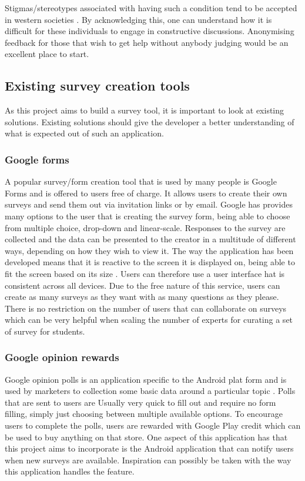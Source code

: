 Stigmas/stereotypes associated with having such a condition tend to be accepted in western societies \cite{corrigan2002paradox}.
By acknowledging this, one can understand how it is difficult for these individuals to engage in constructive discussions.
Anonymising feedback for those that wish to get help without anybody judging would be an excellent place to start. 

\subsection{Existing survey creation tools}
As this project aims to build a survey tool, it is important to look at existing solutions.
Existing solutions should give the developer a better understanding of what is expected out of such an application.

\subsubsection{Google forms}
A popular survey/form creation tool that is used by many people is Google Forms and is offered to users free of charge.
It allows users to create their own surveys and send them out via invitation links or by email.
Google has provides many options to the user that is creating the survey form, being able to choose from multiple choice, drop-down and linear-scale.
Responses to the survey are collected and the data can be presented to the creator in a multitude of different ways, depending on how they wish to
view it. 
The way the application has been developed means that it is reactive to the screen it is displayed on, being able to fit the screen based on its size \cite{google2015forms}.
Users can therefore use a user interface hat is consistent across all devices. 
Due to the free nature of this service, users can create as many surveys as they want with as many questions as they please.
There is no restriction on the number of users that can collaborate on surveys which can be very helpful when scaling the number of experts for curating 
a set of survey for students.

\subsubsection{Google opinion rewards}
Google opinion polls is an application specific to the Android plat form and is used by marketers to collection some basic data around a particular topic \cite{google2018opinionrewards}.
Polls that are sent to users are Usually very quick to fill out and require no form filling, simply just choosing between multiple available options.
To encourage users to complete the polls, users are rewarded with Google Play credit which can be used to buy anything on that store. 
One aspect of this application has that this project aims to incorporate is the Android application that can notify users when new surveys are available.
Inspiration can possibly be taken with the way this application handles the feature.

